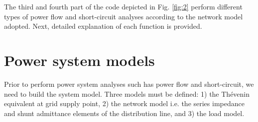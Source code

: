 \documentclass[12pt]{article}
\begin{document}
The third and fourth part of the code depicted in Fig. \ref{fig:2} perform different types of power flow and short-circuit analyses according to the network model adopted. Next, detailed explanation of each function is provided.

\begin{figure}[hbt]
\end{figure}
\begin{figure}[hbt]
\end{figure}
\newpage



\section{Power system models}

Prior to perform power system analyses such has power flow and  short-circuit, we need to build the system 
model. Three models must be defined: 1) the Th\'evenin equivalent at grid supply point, 2) the network model i.e. the series impedance and shunt admittance elements of the distribution line, and  3) the load model. 

\end{document}
